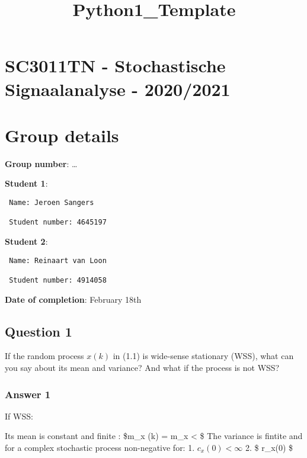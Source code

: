 \documentclass[11pt]{article}
\title{Python1\_Template}
\begin{document}
    
    \maketitle
    
    

    
    \hypertarget{sc3011tn---stochastische-signaalanalyse---20202021}{%
\section{SC3011TN - Stochastische Signaalanalyse -
2020/2021}\label{sc3011tn---stochastische-signaalanalyse---20202021}}

    \hypertarget{group-details}{%
\section{Group details}\label{group-details}}

\textbf{Group number}: \ldots{}

\textbf{Student 1}:

\begin{verbatim}
 Name: Jeroen Sangers
 
 Student number: 4645197
\end{verbatim}

\textbf{Student 2}:

\begin{verbatim}
 Name: Reinaart van Loon 
 
 Student number: 4914058
\end{verbatim}

\textbf{Date of completion}: February 18th

    \hypertarget{question-1}{%
\subsection{Question 1}\label{question-1}}

If the random process \(x(k)\) in (1.1) is wide-sense stationary (WSS),
what can you say about its mean and variance? And what if the process is
not WSS?

    \hypertarget{answer-1}{%
\subsubsection{Answer 1}\label{answer-1}}

If WSS:

Its mean is constant and finite : \$m\_x (k) = m\_x \textless{}
\infty \$ The variance is fintite and for a complex stochastic process
non-negative for: 1. \(c_x (0) < \infty\) 2. \$ r\_x(0) \$
\end{document}
